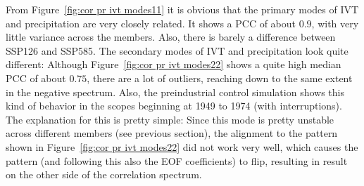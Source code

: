 From Figure~\ref{fig:cor pr ivt modes11} it is obvious that the primary modes of IVT and precipitation are very closely related. 
It shows a PCC of about $0.9$, with very little variance across the members. 
Also, there is barely a difference between SSP126 and SSP585. 
The secondary modes of IVT and precipitation look quite different: 
Although Figure~\ref{fig:cor pr ivt modes22} shows a quite high median PCC of about $0.75$, there are a lot of outliers, reaching down to the same extent in the negative spectrum. 
Also, the preindustrial control simulation shows this kind of behavior in the scopes beginning at 1949 to 1974 (with interruptions). 
The explanation for this is pretty simple: Since this mode is pretty unstable across different members (see previous section), the alignment to the pattern shown in Figure~\ref{fig:cor pr ivt modes22} did not work very well, which causes the pattern (and following this also the EOF coefficients) to flip, resulting in result on the other side of the correlation spectrum. 



